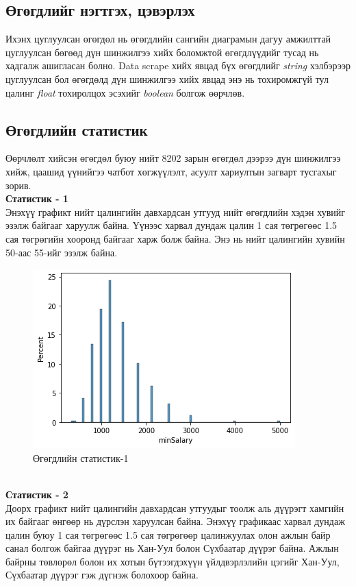 \subsection{Өгөгдлийг нэгтгэх, цэвэрлэх}
Ихэнх цуглуулсан өгөгдөл нь өгөгдлийн сангийн диаграмын дагуу амжилттай цуглуулсан бөгөөд дүн шинжилгээ хийх боломжтой өгөгдлүүдийг тусад нь хадгалж ашигласан болно. Data scrape хийх явцад бүх өгөгдлийг \textit{string} хэлбэрээр цуглуулсан бол өгөгдөлд дүн шинжилгээ хийх явцад энэ нь тохиромжгүй тул цалинг \textit{float} тохиролцох эсэхийг \textit{boolean} болгож өөрчлөв. 

\newpage
\subsection{Өгөгдлийн статистик}
Өөрчлөлт хийсэн өгөгдөл буюу нийт 8202 зарын өгөгдөл дээрээ дүн шинжилгээ хийж, цаашид үүнийгээ чатбот хөгжүүлэлт, асуулт хариултын загварт тусгахыг зорив.
\\\indent\textbf{Статистик - 1}
\\Энэхүү графикт нийт цалингийн давхардсан утгууд нийт өгөгдлийн хэдэн хувийг эзэлж байгааг харуулж байна. Үүнээс харвал дундаж цалин 1 сая төгрөгөөс 1.5 сая төгрөгийн хооронд байгааг харж болж байна. Энэ нь нийт цалингийн хувийн 50-аас 55-ийг эзэлж байна. 
\begin{figure}[ht]
  \centering
  \includegraphics[width=\textwidth]{graphics/2.png}
  \caption{Өгөгдлийн статистик-1}\label{fig:statistics1}
\end{figure}
\\\indent\textbf{Статистик - 2}
\\Доорх графикт нийт цалингийн давхардсан утгуудыг тоолж аль дүүрэгт хамгийн их байгааг өнгөөр нь дүрслэн харуулсан байна. Энэхүү графикаас харвал дундаж цалин буюу 1 сая төгрөгөөс 1.5 сая төгрөгөөр цалинжуулах олон ажлын байр санал болгож байгаа дүүрэг нь Хан-Уул болон Сүхбаатар дүүрэг байна. Ажлын байрны төвлөрөл болон их хотын бүтээгдэхүүн үйлдвэрлэлийн цэгийг Хан-Уул, Сүхбаатар дүүрэг гэж дүгнэж болохоор байна.  
